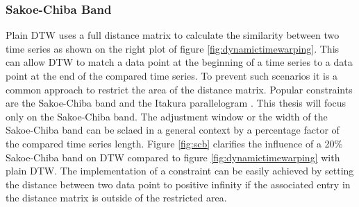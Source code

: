 \subsubsection{Sakoe-Chiba Band} \label{sakoe-chiba_band}
Plain DTW uses a full distance matrix to calculate the similarity between two time series as shown on the right plot of
figure \ref{fig:dynamictimewarping}. This can allow DTW to match a data point at the beginning of a time series to a
data point at the end of the compared time series. To prevent such scenarios it is a common approach to restrict the
area of the distance matrix. Popular constraints are the Sakoe-Chiba band \cite{sakoe1978dynamic} and the Itakura
parallelogram \cite{itakura1975minimum}. This thesis will focus only on the Sakoe-Chiba band. The adjustment window or
the width of the Sakoe-Chiba band can be sclaed in a general context by a percentage factor of the compared time series
length. Figure \ref{fig:scb} clarifies the influence of a 20\% Sakoe-Chiba band on DTW compared to figure
\ref{fig:dynamictimewarping} with plain DTW. The implementation of a constraint can be easily achieved by setting the
distance between two data point to positive infinity if the associated entry in the distance matrix is outside of the
restricted area.

